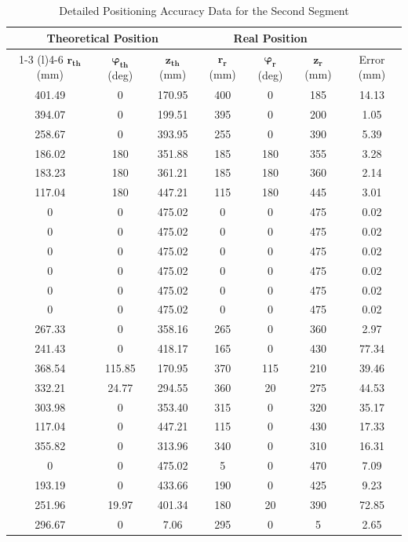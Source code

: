 \documentclass[conference]{IEEEtran}
\begin{document}
\begin{table}[h]
\captionsetup{skip=10pt}
\centering

\caption{Detailed Positioning Accuracy Data for the Second Segment}
\label{tab:segment2_error_data} %

\begin{tabular}{@{}ccccccc@{}}
\toprule
\multicolumn{3}{c}{Theoretical Position} & \multicolumn{3}{c}{Real Position} & \\
\cmidrule(r){1-3} \cmidrule(l){4-6}
$\boldsymbol{r_{th}}$ (mm) & $\boldsymbol{\varphi_{th}}$ (deg) & $\boldsymbol{z_{th}}$ (mm) & $\boldsymbol{r_{r}}$ (mm) & $\boldsymbol{\varphi_{r}}$ (deg) & $\boldsymbol{z_{r}}$ (mm) & Error (mm) \\
\midrule
401.49 & 0      & 170.95 & 400 & 0   & 185 & 14.13 \\
394.07 & 0      & 199.51 & 395 & 0   & 200 & 1.05 \\
258.67 & 0      & 393.95 & 255 & 0   & 390 & 5.39 \\
186.02 & 180    & 351.88 & 185 & 180 & 355 & 3.28 \\
183.23 & 180    & 361.21 & 185 & 180 & 360 & 2.14 \\
117.04 & 180    & 447.21 & 115 & 180 & 445 & 3.01 \\
0      & 0      & 475.02 & 0   & 0   & 475 & 0.02 \\
0      & 0      & 475.02 & 0   & 0   & 475 & 0.02 \\
0      & 0      & 475.02 & 0   & 0   & 475 & 0.02 \\
0      & 0      & 475.02 & 0   & 0   & 475 & 0.02 \\
0      & 0      & 475.02 & 0   & 0   & 475 & 0.02 \\
0      & 0      & 475.02 & 0   & 0   & 475 & 0.02 \\
267.33 & 0      & 358.16 & 265 & 0   & 360 & 2.97 \\
241.43 & 0      & 418.17 & 165 & 0   & 430 & 77.34 \\
368.54 & 115.85 & 170.95 & 370 & 115 & 210 & 39.46 \\
332.21 & 24.77  & 294.55 & 360 & 20  & 275 & 44.53 \\
303.98 & 0      & 353.40 & 315 & 0   & 320 & 35.17 \\
117.04 & 0      & 447.21 & 115 & 0   & 430 & 17.33 \\
355.82 & 0      & 313.96 & 340 & 0   & 310 & 16.31 \\
0      & 0      & 475.02 & 5   & 0   & 470 & 7.09 \\
193.19 & 0      & 433.66 & 190 & 0   & 425 & 9.23 \\
251.96 & 19.97  & 401.34 & 180 & 20  & 390 & 72.85 \\
296.67 & 0      & 7.06   & 295 & 0   & 5   & 2.65 \\
\bottomrule
\end{tabular}

\end{table}
\end{document}
